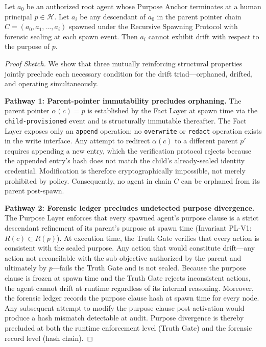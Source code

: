 \begin{theorem}
\label{th:drift-prevention}
Let $a_0$ be an authorized root agent whose Purpose Anchor terminates at a human principal $p \in \mathcal{H}$. Let $a_i$ be any descendant of $a_0$ in the parent pointer chain $C = (a_0, a_1, \ldots, a_i)$ spawned under the Recursive Spawning Protocol with forensic sealing at each spawn event. Then $a_i$ cannot exhibit drift with respect to the purpose of $p$.
\end{theorem}

\begin{proof}[Proof Sketch]
We show that three mutually reinforcing structural properties jointly preclude each necessary condition for the drift triad---orphaned, drifted, and operating simultaneously.

\medskip
\noindent\textbf{Pathway 1: Parent-pointer immutability precludes orphaning.}
The parent pointer $\alpha(c) = p$ is established by the Fact Layer at spawn time via the \texttt{child-provisioned} event and is structurally immutable thereafter. The Fact Layer exposes only an \texttt{append} operation; no \texttt{overwrite} or \texttt{redact} operation exists in the write interface. Any attempt to redirect $\alpha(c)$ to a different parent $p'$ requires appending a new entry, which the verification protocol rejects because the appended entry's hash does not match the child's already-sealed identity credential. Modification is therefore cryptographically impossible, not merely prohibited by policy. Consequently, no agent in chain $C$ can be orphaned from its parent post-spawn.

\medskip
\noindent\textbf{Pathway 2: Forensic ledger precludes undetected purpose divergence.}
The Purpose Layer enforces that every spawned agent's purpose clause is a strict descendant refinement of its parent's purpose at spawn time (Invariant PL-V1: $R(c) \subset R(p)$). At execution time, the Truth Gate verifies that every action is consistent with the sealed purpose. Any action that would constitute drift---any action not reconcilable with the sub-objective authorized by the parent and ultimately by $p$---fails the Truth Gate and is not sealed. Because the purpose clause is frozen at spawn time and the Truth Gate rejects inconsistent actions, the agent cannot drift at runtime regardless of its internal reasoning. Moreover, the forensic ledger records the purpose clause hash at spawn time for every node. Any subsequent attempt to modify the purpose clause post-activation would produce a hash mismatch detectable at audit. Purpose divergence is thereby precluded at both the runtime enforcement level (Truth Gate) and the forensic record level (hash chain).


\end{proof}
